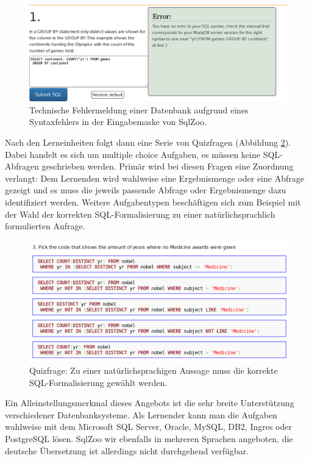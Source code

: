 \begin{figure}[h]
  \centering \includegraphics[width=\textwidth]{images/related-work-sql-zoo-error.png}
  \caption{Technische Fehlermeldung einer Datenbank aufgrund eines Syntaxfehlers in der Eingabemaske von SqlZoo.}
  \label{fig:sqlzoo-check-result}
\end{figure}

Nach den Lerneinheiten folgt dann eine Serie von Quizfragen (Abbildung \ref{fig:sqlzoo-quiz-sql-formalization}). Dabei handelt es sich um multiple choice Aufgaben, es müssen keine SQL-Abfragen geschrieben werden. Primär wird bei diesen Fragen eine Zuordnung verlangt: Dem Lernenden wird wahlweise eine Ergebnismenge oder eine Abfrage gezeigt und es muss die jeweils passende Abfrage oder Ergebnismenge dazu identifiziert werden. Weitere Aufgabentypen beschäftigen sich zum Beispiel mit der Wahl der korrekten SQL-Formalisierung zu einer natürlichsprachlich formulierten Anfrage.

\begin{figure}[h]
  \centering \includegraphics[width=\textwidth]{images/related-work-sql-zoo-quiz-select-sql.png}
  \caption{Quizfrage: Zu einer natürlichsprachigen Aussage muss die korrekte SQL-Formalisierung gewählt werden.}
  \label{fig:sqlzoo-quiz-sql-formalization}
\end{figure}

Ein Alleinstellungsmerkmal dieses Angebots ist die sehr breite Unterstützung verschiedener Datenbanksysteme. Als Lernender kann man die Aufgaben wahlweise mit dem Microsoft SQL Server, Oracle, MySQL, DB2, Ingres oder PostgreSQL lösen. SqlZoo wir ebenfalls in mehreren Sprachen angeboten, die deutsche Übersetzung ist allerdings nicht durchgehend verfügbar.

